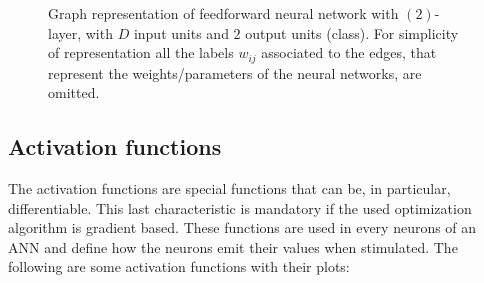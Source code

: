\begin{figure}[t]
	\caption[Graph representation of feedforward neural network.]{Graph representation of feedforward neural network with $(2)$-layer, with $D$ input units and $2$ output units (class). For simplicity of representation all the labels $w_{ij}$ associated to the edges, that represent the weights/parameters of the neural networks, are omitted.}
	\label{fig:multilayer-perceptron}
\end{figure}

\subsection{Activation functions}\label{sec:activation-functions}
The activation functions are special functions that can be, in particular, differentiable. This last characteristic is mandatory if the used optimization algorithm is gradient based. These functions are used in every neurons of an ANN and define how the neurons emit their values when stimulated. The following are some activation functions with their plots:\newline\newline

